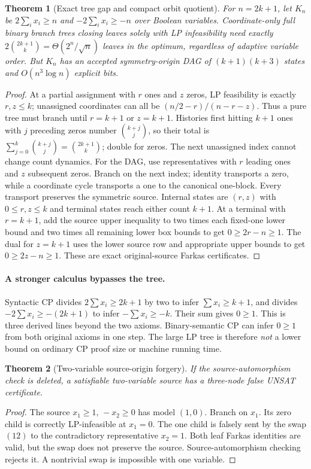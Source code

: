 \documentclass{article}
\newtheorem{theorem}{Theorem}
\begin{document}
\begin{theorem}[Exact tree gap and compact orbit quotient]
For $n=2k+1$, let $K_n$ be $2\sum_i x_i\ge n$ and $-2\sum_i x_i\ge-n$ over Boolean variables. Coordinate-only full binary branch trees closing leaves \emph{solely} with LP infeasibility need exactly $2\binom{2k+1}{k}=\Theta(2^n/\sqrt n)$ leaves in the optimum, regardless of adaptive variable order. But $K_n$ has an accepted symmetry-origin DAG of $(k+1)(k+3)$ states and $O(n^3\log n)$ explicit bits.
\end{theorem}
\begin{proof}
At a partial assignment with $r$ ones and $z$ zeros, LP feasibility is exactly $r,z\le k$; unassigned coordinates can all be $(n/2-r)/(n-r-z)$. Thus a pure tree must branch until $r=k+1$ or $z=k+1$. Histories first hitting $k+1$ ones with $j$ preceding zeros number $\binom{k+j}{j}$, so their total is $\sum_{j=0}^k\binom{k+j}{j}=\binom{2k+1}{k}$; double for zeros. The next unassigned index cannot change count dynamics. For the DAG, use representatives with $r$ leading ones and $z$ subsequent zeros. Branch on the next index; identity transports a zero, while a coordinate cycle transports a one to the canonical one-block. Every transport preserves the symmetric source. Internal states are $(r,z)$ with $0\le r,z\le k$ and terminal states reach either count $k+1$. At a terminal with $r=k+1$, add the source upper inequality to two times each fixed-one lower bound and two times all remaining lower box bounds to get $0\ge2r-n\ge1$. The dual for $z=k+1$ uses the lower source row and appropriate upper bounds to get $0\ge2z-n\ge1$. These are exact original-source Farkas certificates.
\end{proof}

\paragraph{A stronger calculus bypasses the tree.} Syntactic CP divides $2\sum x_i\ge2k+1$ by two to infer $\sum x_i\ge k+1$, and divides $-2\sum x_i\ge-(2k+1)$ to infer $-\sum x_i\ge-k$. Their sum gives $0\ge1$. This is three derived lines beyond the two axioms. Binary-semantic CP can infer $0\ge1$ from both original axioms in one step. The large LP tree is therefore \emph{not} a lower bound on ordinary CP proof size or machine running time.

\begin{theorem}[Two-variable source-origin forgery]
If the source-automorphism check is deleted, a satisfiable two-variable source has a three-node false UNSAT certificate.
\end{theorem}
\begin{proof}
The source $x_1\ge1,\,-x_2\ge0$ has model $(1,0)$. Branch on $x_1$. Its zero child is correctly LP-infeasible at $x_1=0$. The one child is falsely sent by the swap $(12)$ to the contradictory representative $x_2=1$. Both leaf Farkas identities are valid, but the swap does not preserve the source. Source-automorphism checking rejects it. A nontrivial swap is impossible with one variable.
\end{proof}
\end{document}
